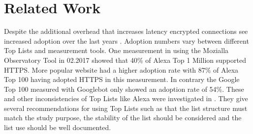 \chapter{Related Work}\label{chapter:Related Work}

Despite the additional overhead that increases latency encrypted connections see increased adoption over the last years \cite{DBLP:conf/conext/NaylorFLGMMPS14}. 
Adoption numbers vary between different Top Lists and measurement tools.
One measurement in \cite{DBLP:conf/uss/FeltBKPBT17} using the Mozialla Observatory Tool in 02.2017 showed that 40\% of Alexa Top 1 Million supported HTTPS.
More popular website had a higher adoption rate with 87\% of Alexa Top 100 having adopted HTTPS in this measurement.
In contrary the Google Top 100 measured with Googlebot only showed an adoption rate of 54\%.
These and other inconsistencies of Top Lists like Alexa were investigated in \cite{DBLP:journals/corr/abs-1805-11506}.
They give several recommendations for using Top Lists such as that the list structure must match the study purpose, the stability of the list should be considered and the list use should be well documented.
  

